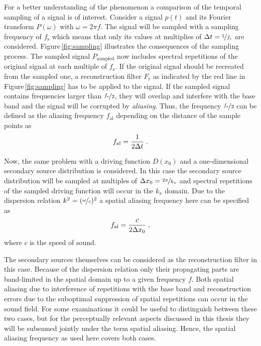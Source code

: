 For a better understanding of the phenomenon a comparison of the temporal
sampling of a signal is of interest. Consider a signal $p(t)$ and its Fourier
transform $P(\omega)$ with $\omega = 2\pi f$. The signal will be sampled with a
sampling frequency of $f_\text{s}$ which means that only its values at multiplies of
$\Delta t = \nicefrac{1}{f_\text{s}}$ are considered. Figure\,\ref{fig:sampling}
illustrates the consequences of the sampling process. The sampled signal
$P_\text{sampled}$ now includes spectral repetitions of the original signal at
each multiple
of $f_\text{s}$. If the original signal should be recreated from the sampled
one, a reconstruction filter $F_\text{r}$ as indicated by the red line in
Figure\,\ref{fig:sampling} has to be applied to the signal.
If the sampled signal contains frequencies larger than
$\nicefrac{f_\text{s}}{2}$, they will overlap and interfere with the base band
and the signal will be corrupted by \emph{aliasing}.
Thus, the frequency $\nicefrac{f_\text{s}}{2}$
can be defined as the aliasing frequency $f_\text{al}$ depending on the
distance of the sample points as
%
\begin{equation}
    f_\text{al} = \frac{1}{2\Delta t} \qp
    \label{eq:fal_time}
\end{equation}
%

Now, the same problem with a driving function $D(x_0)$ and a one-dimensional
secondary source distribution is considered. In this case the secondary source
distribution will be sampled at multiples of $\Delta x_0 =
\nicefrac{2\pi}{k_x}$ and spectral repetitions
of the sampled driving function will occur in the $k_x$ domain. Due to the
dispersion relation $k^2 = (\nicefrac{\omega}{c})^2$ a spatial
aliasing frequency here can be specified as
%
\begin{equation}
    f_\text{al} = \frac{c}{2\Delta x_0} \qc
    \label{eq:fal}
\end{equation}
%
where $c$ is the speed of sound.

The secondary sources themselves can be considered as the reconstruction filter in this case.
Because of the dispersion relation only their propagating parts are band-limited in
the spatial domain up to a given frequency $f$. Both spatial
aliasing due to interference of repetitions with the base band and
reconstruction errors due to the suboptimal suppression of spatial repetitions
can occur in the sound field.
For some examinations it could be useful to distinguish between these two
cases,\autocite[][Chap.\,4 deals with the discretization of
different secondary source distribution in great detail.]{Ahrens2012} but for the
perceptually relevant aspects discussed in this thesis they will be subsumed
jointly under the term spatial aliasing. Hence, the spatial aliasing frequency
as used here covers both cases.


